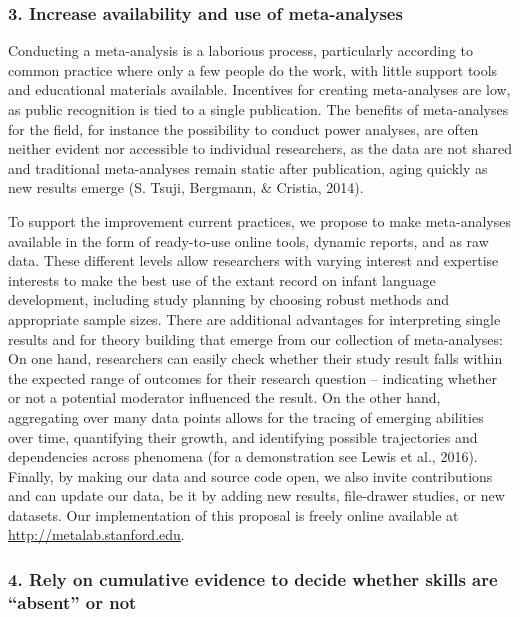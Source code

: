 \documentclass[english,floatsintext,man]{apa6}
\begin{document}
\subsubsection{3. Increase availability and use of
meta-analyses}\label{increase-availability-and-use-of-meta-analyses}

Conducting a meta-analysis is a laborious process, particularly
according to common practice where only a few people do the work, with
little support tools and educational materials available. Incentives for
creating meta-analyses are low, as public recognition is tied to a
single publication. The benefits of meta-analyses for the field, for
instance the possibility to conduct power analyses, are often neither
evident nor accessible to individual researchers, as the data are not
shared and traditional meta-analyses remain static after publication,
aging quickly as new results emerge (S. Tsuji, Bergmann, \& Cristia,
2014).

To support the improvement current practices, we propose to make
meta-analyses available in the form of ready-to-use online tools,
dynamic reports, and as raw data. These different levels allow
researchers with varying interest and expertise interests to make the
best use of the extant record on infant language development, including
study planning by choosing robust methods and appropriate sample sizes.
There are additional advantages for interpreting single results and for
theory building that emerge from our collection of meta-analyses: On one
hand, researchers can easily check whether their study result falls
within the expected range of outcomes for their research question --
indicating whether or not a potential moderator influenced the result.
On the other hand, aggregating over many data points allows for the
tracing of emerging abilities over time, quantifying their growth, and
identifying possible trajectories and dependencies across phenomena (for
a demonstration see Lewis et al., 2016). Finally, by making our data and
source code open, we also invite contributions and can update our data,
be it by adding new results, file-drawer studies, or new datasets. Our
implementation of this proposal is freely online available at
\url{http://metalab.stanford.edu}.

\subsubsection{\texorpdfstring{4. Rely on cumulative evidence to decide
whether skills are \enquote{absent} or
not}{4. Rely on cumulative evidence to decide whether skills are absent or not}}\label{rely-on-cumulative-evidence-to-decide-whether-skills-are-absent-or-not}
\end{document}
